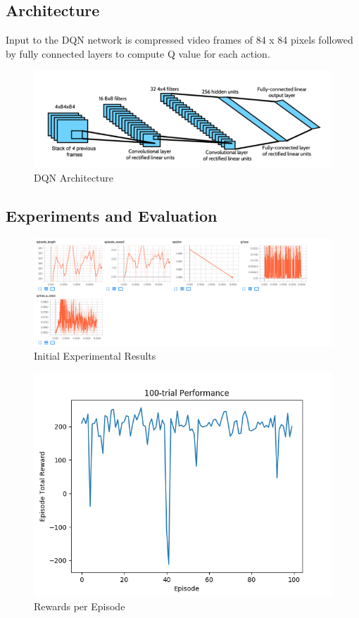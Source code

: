\subsection{Architecture}

Input to the DQN network is compressed video frames of 84 x 84 pixels followed by fully connected layers to compute Q value for each action.

\begin{figure}%
\centering
\includegraphics[width=0.6\columnwidth]{figures/DQN-architecture.png}%
\caption{DQN Architecture}%
\label{fig:datastats}%
\end{figure}




\subsection{Experiments and Evaluation}

\begin{figure}%
\centering
\includegraphics[width=0.8\columnwidth]{figures/tensorboard.png}%
\caption{Initial Experimental Results}%
\label{fig:datastats}%
\end{figure}





\begin{figure}%
\centering
\includegraphics[width=0.6\columnwidth]{figures/evaluate_100.png}%
\caption{Rewards per Episode}%
\label{fig:datastats}%
\end{figure}


